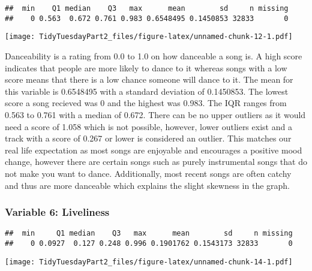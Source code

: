 \documentclass[
]{article}
\newenvironment{Shaded}{\begin{snugshade}}{\end{snugshade}}
\newcommand{\KeywordTok}[1]{\textcolor[rgb]{0.13,0.29,0.53}{\textbf{#1}}}
\newcommand{\NormalTok}[1]{#1}
\newcommand{\OperatorTok}[1]{\textcolor[rgb]{0.81,0.36,0.00}{\textbf{#1}}}
\newcommand{\StringTok}[1]{\textcolor[rgb]{0.31,0.60,0.02}{#1}}
\begin{document}
\begin{verbatim}
##  min    Q1 median    Q3   max      mean        sd     n missing
##    0 0.563  0.672 0.761 0.983 0.6548495 0.1450853 32833       0
\end{verbatim}

\texttt{[image: TidyTuesdayPart2\_files/figure-latex/unnamed-chunk-12-1.pdf]}

Danceability is a rating from 0.0 to 1.0 on how danceable a song is. A
high score indicates that people are more likely to dance to it whereas
songs with a low score means that there is a low chance someone will
dance to it. The mean for this variable is 0.6548495 with a standard
deviation of 0.1450853. The lowest score a song recieved was 0 and the
highest was 0.983. The IQR ranges from 0.563 to 0.761 with a median of
0.672. There can be no upper outliers as it would need a score of 1.058
which is not possible, however, lower outliers exist and a track with a
score of 0.267 or lower is considered an outlier. This matches our real
life expectation as most songs are enjoyable and encourages a positive
mood change, however there are certain songs such as purely instrumental
songs that do not make you want to dance. Additionally, most recent
songs are often catchy and thus are more danceable which explains the
slight skewness in the graph.

\hypertarget{variable-6-liveliness}{%
\subsubsection{Variable 6: Liveliness}\label{variable-6-liveliness}}

\begin{Shaded}
\end{Shaded}

\begin{verbatim}
##  min     Q1 median    Q3   max      mean        sd     n missing
##    0 0.0927  0.127 0.248 0.996 0.1901762 0.1543173 32833       0
\end{verbatim}

\texttt{[image: TidyTuesdayPart2\_files/figure-latex/unnamed-chunk-14-1.pdf]}
\end{document}
